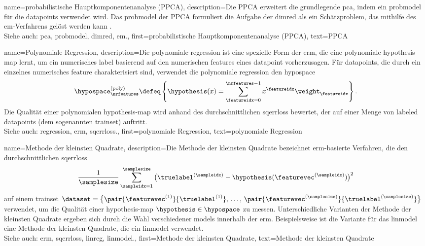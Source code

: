 {{{{
{
    name={probabilistische Hauptkomponentenanalyse (PPCA)}, 
    description={Die PPCA 
        erweitert die grundlegende \gls{pca}, indem ein \gls{probmodel} 
        für die \glspl{datapoint} verwendet wird.  
        Das \gls{probmodel} der PPCA formuliert die Aufgabe der \gls{dimred} 
        als ein Schätzproblem, das mithilfe des \gls{em}-Verfahrens gelöst werden kann 
        \cite{TippingProbPCA}.  
        \\
        Siehe auch: \gls{pca}, \gls{probmodel}, \gls{dimred}, \gls{em}.},
    first={probabilistische Hauptkomponentenanalyse (PPCA)},
    text={PPCA}
}

{
    name={Polynomiale Regression}, 
    description={Die polynomiale 
        \gls{regression} ist eine spezielle Form der \gls{erm}, 
        die eine polynomiale \gls{hypothesis}-\gls{map} lernt, 
        um ein numerisches \gls{label} basierend auf den numerischen 
        \glspl{feature} eines \gls{datapoint} vorherzusagen.  
        Für \glspl{datapoint}, die durch ein einzelnes numerisches \gls{feature} charakterisiert sind, 
        verwendet die polynomiale \gls{regression} den \gls{hypospace}
        $$
        \hypospace^{(\rm poly)}_{\nrfeatures} \defeq 
        \left\{ \hypothesis(x) = \sum_{\featureidx=0}^{\nrfeatures-1} x^{\featureidx} \weight_{\featureidx} \right\}.
        $$
        Die Qualität einer polynomialen \gls{hypothesis}-\gls{map} 
        wird anhand des durchschnittlichen \gls{sqerrloss} bewertet, 
        der auf einer Menge von \glspl{labeled datapoint} 
        (dem sogenannten \gls{trainset}) auftritt.  
        \\
        Siehe auch: \gls{regression}, \gls{erm}, \gls{sqerrloss}.},
    first={polynomiale Regression},
    text={polynomiale Regression}
}

{
    name={Methode der kleinsten Quadrate}, 
    description={Die Methode der kleinsten Quadrate 
        bezeichnet \gls{erm}-basierte Verfahren, die den durchschnittlichen 
        \gls{sqerrloss}
        $$
        \frac{1}{\samplesize} \sum_{\sampleidx=1}^{\samplesize} 
        \big( \truelabel^{(\sampleidx)} - \hypothesis(\featurevec^{(\sampleidx)}) \big)^{2}
        $$
        auf einem \gls{trainset} 
        $\dataset = \big\{ \pair{\featurevec^{(1)}}{\truelabel^{(1)}}, \,\ldots, \,
        \pair{\featurevec^{(\samplesize)}}{\truelabel^{(\samplesize)}} \big\}$ 
        verwendet, um die Qualität einer \gls{hypothesis}-\gls{map} 
        $\hypothesis \in \hypospace$ zu messen.  
        Unterschiedliche Varianten der Methode der kleinsten Quadrate 
        ergeben sich durch die Wahl verschiedener \glspl{model} innerhalb der \gls{erm}.  
        Beispielsweise ist die Variante für das \gls{linmodel} 
        eine Methode der kleinsten Quadrate, die ein \gls{linmodel} verwendet.  
        \\
        Siehe auch: \gls{erm}, \gls{sqerrloss}, \gls{linreg}, \gls{linmodel}.},
    first={Methode der kleinsten Quadrate},
    text={Methode der kleinsten Quadrate}
}

}}}}

